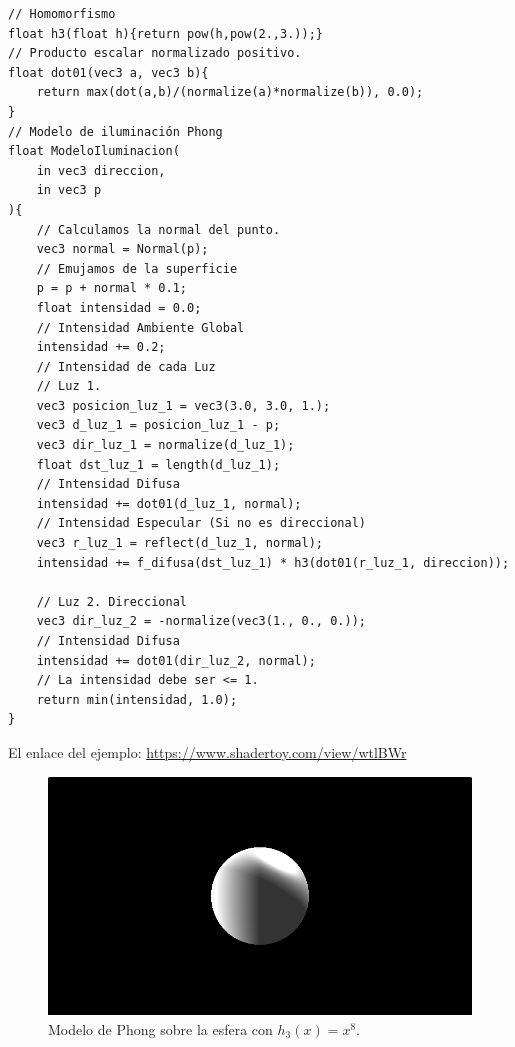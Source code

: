 \begin{lstlisting}
// Homomorfismo
float h3(float h){return pow(h,pow(2.,3.));}
// Producto escalar normalizado positivo.
float dot01(vec3 a, vec3 b){ 
    return max(dot(a,b)/(normalize(a)*normalize(b)), 0.0);
}
// Modelo de iluminación Phong
float ModeloIluminacion(
    in vec3 direccion,
    in vec3 p
){
    // Calculamos la normal del punto.
    vec3 normal = Normal(p);
    // Emujamos de la superficie
    p = p + normal * 0.1;
    float intensidad = 0.0;
    // Intensidad Ambiente Global
    intensidad += 0.2;
    // Intensidad de cada Luz
    // Luz 1.
    vec3 posicion_luz_1 = vec3(3.0, 3.0, 1.);
    vec3 d_luz_1 = posicion_luz_1 - p;
    vec3 dir_luz_1 = normalize(d_luz_1);
    float dst_luz_1 = length(d_luz_1);
    // Intensidad Difusa
    intensidad += dot01(d_luz_1, normal);
    // Intensidad Especular (Si no es direccional)
    vec3 r_luz_1 = reflect(d_luz_1, normal);
    intensidad += f_difusa(dst_luz_1) * h3(dot01(r_luz_1, direccion));
    
    // Luz 2. Direccional
    vec3 dir_luz_2 = -normalize(vec3(1., 0., 0.));
    // Intensidad Difusa
    intensidad += dot01(dir_luz_2, normal);
    // La intensidad debe ser <= 1.
    return min(intensidad, 1.0);
}
\end{lstlisting}

El enlace del ejemplo: \url{https://www.shadertoy.com/view/wtlBWr}\\
\begin{figure}[H]
  \centering
  \captionsetup{justification=centering}%
  \includegraphics[width=1.0\textwidth]{secciones/imagenes/lightmodel/phong.png}
  \caption{Modelo de Phong sobre la esfera con \(h_3(x)=x^8\).}
  \label{fig:phong}
\end{figure}

